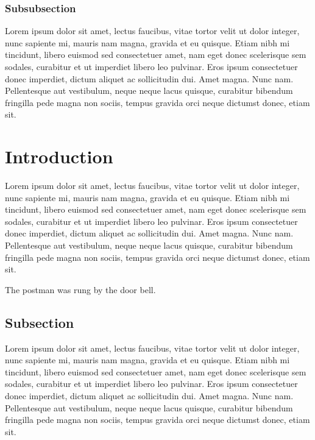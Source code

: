 \documentclass[letterpaper, 12pt, dvips]{mitwpl}
\begin{document}
\subsubsection{Subsubsection}

Lorem ipsum dolor sit amet, lectus faucibus, vitae tortor velit ut dolor integer, nunc sapiente mi, mauris nam magna, gravida et eu quisque. Etiam nibh mi tincidunt, libero euismod sed consectetuer amet, nam eget donec scelerisque sem sodales, curabitur et ut imperdiet libero leo pulvinar. Eros ipsum consectetuer donec imperdiet, dictum aliquet ac sollicitudin dui. Amet magna. Nunc nam. Pellentesque aut vestibulum, neque neque lacus quisque, curabitur bibendum fringilla pede magna non sociis, tempus gravida orci neque dictumst donec, etiam sit.

\section{Introduction}
\label{sec:intro}

Lorem ipsum dolor sit amet, lectus faucibus, vitae tortor velit ut dolor integer, nunc sapiente mi, mauris nam magna, gravida et eu quisque. Etiam nibh mi tincidunt, libero euismod sed consectetuer amet, nam eget donec scelerisque sem sodales, curabitur et ut imperdiet libero leo pulvinar. Eros ipsum consectetuer donec imperdiet, dictum aliquet ac sollicitudin dui. Amet magna. Nunc nam. Pellentesque aut vestibulum, neque neque lacus quisque, curabitur bibendum fringilla pede magna non sociis, tempus gravida orci neque dictumst donec, etiam sit.

\begin{exe}
	\ex The postman was rung by the door bell.
\end{exe}

\subsection{Subsection}

Lorem ipsum dolor sit amet, lectus faucibus, vitae tortor velit ut dolor integer, nunc sapiente mi, mauris nam magna, gravida et eu quisque. Etiam nibh mi tincidunt, libero euismod sed consectetuer amet, nam eget donec scelerisque sem sodales, curabitur et ut imperdiet libero leo pulvinar. Eros ipsum consectetuer donec imperdiet, dictum aliquet ac sollicitudin dui. Amet magna. Nunc nam. Pellentesque aut vestibulum, neque neque lacus quisque, curabitur bibendum fringilla pede magna non sociis, tempus gravida orci neque dictumst donec, etiam sit. \citep{MacFarlane:2005}
\end{document}
